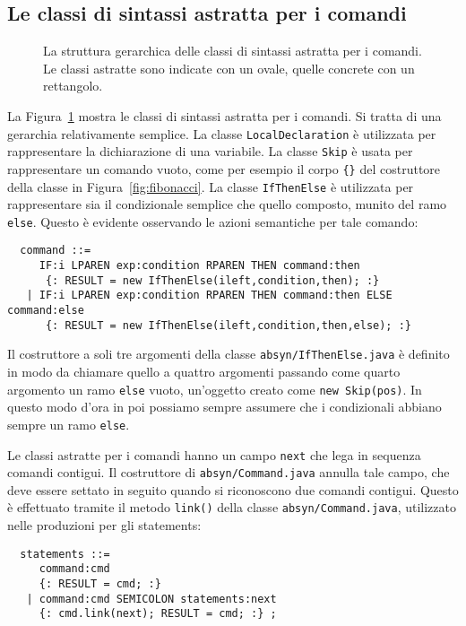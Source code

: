 \subsection{Le classi di sintassi astratta per i comandi}
  \label{subsec:commands_abstract}
%
\begin{figure}[t]
\begin{center}
\end{center}
\caption{La struttura gerarchica delle classi di sintassi astratta per
         i comandi. Le classi astratte sono indicate con un
         ovale, quelle concrete con un rettangolo.}
  \label{fig:commands_hierarchy}
\end{figure}
%
La Figura~\ref{fig:commands_hierarchy} mostra le classi di sintassi astratta
per i comandi. Si tratta di una gerarchia relativamente semplice.
La classe \texttt{LocalDeclaration} \`e
utilizzata per rappresentare la dichiarazione di una variabile.
La classe \texttt{Skip} \`e usata per rappresentare un comando vuoto,
come per esempio il corpo \verb!{}! del costruttore della classe in
Figura~\ref{fig:fibonacci}.
La classe \texttt{IfThenElse} \`e utilizzata per rappresentare sia il
condizionale semplice che quello composto, \cioe munito del ramo \texttt{else}.
Questo \`e evidente osservando le azioni semantiche per tale comando:
%
\begin{verbatim}
  command ::=
     IF:i LPAREN exp:condition RPAREN THEN command:then
      {: RESULT = new IfThenElse(ileft,condition,then); :}
   | IF:i LPAREN exp:condition RPAREN THEN command:then ELSE command:else
      {: RESULT = new IfThenElse(ileft,condition,then,else); :}
\end{verbatim}
%
Il costruttore a soli tre argomenti della classe
\texttt{absyn/IfThenElse.java} \`e definito in modo da chiamare
quello a quattro argomenti passando come quarto argomento un ramo
\texttt{else} vuoto, \cioe un'oggetto creato come
\texttt{new Skip(pos)}. In questo modo d'ora in poi possiamo sempre
assumere che i condizionali abbiano sempre un ramo \texttt{else}.

Le classi astratte per i comandi hanno un campo
\texttt{next} che lega in sequenza comandi contigui.
Il costruttore di \texttt{absyn/Command.java} annulla tale campo,
che deve essere settato in seguito quando si riconoscono due comandi
contigui. Questo \`e effettuato tramite il metodo \texttt{link()} della
classe \texttt{absyn/Command.java}, utilizzato nelle produzioni per gli
statements:
%
\begin{verbatim}
  statements ::=
     command:cmd
     {: RESULT = cmd; :}
   | command:cmd SEMICOLON statements:next
     {: cmd.link(next); RESULT = cmd; :} ;
\end{verbatim}

